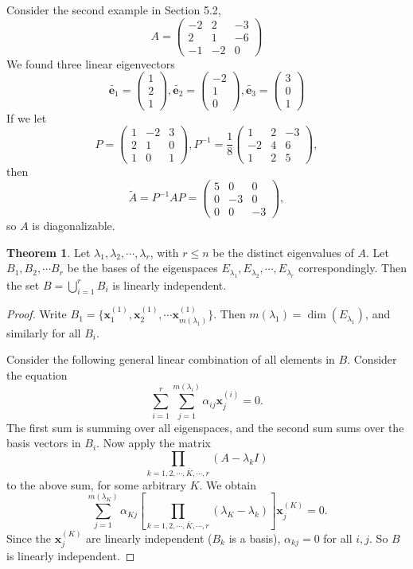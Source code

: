 \documentclass[a4paper]{article}
\theoremstyle{definition}
\newtheorem*{thm}{Theorem}
\newcommand{\mb}[1]{\mathbf{#1}}
\begin{document}
Consider the second example in Section 5.2,
\[
A = \begin{pmatrix}
  -2 & 2 & -3\\
  2 & 1 & -6\\
  -1 & -2 & 0
\end{pmatrix}
\]
We found three linear eigenvectors
\[
\tilde{\mb{e}_1} = 
\begin{pmatrix}
  1\\2\\1
\end{pmatrix}, \tilde{\mb{e}_2} = 
\begin{pmatrix}
  -2\\1\\0
\end{pmatrix}, \tilde{\mb{e}_3} = 
\begin{pmatrix}
  3\\0\\1
\end{pmatrix}
\]
If we let 
\[
P = 
\begin{pmatrix}
  1 & -2 & 3\\
  2 & 1 & 0\\
  1 & 0 & 1
\end{pmatrix}, P^{-1} = \frac{1}{8}
\begin{pmatrix}
  1 & 2 & -3\\
  -2 & 4 & 6\\
  1 & 2 & 5
\end{pmatrix},
\]
then 
\[
\tilde{A} = P^{-1}AP = 
\begin{pmatrix}
  5 & 0 & 0\\
  0 & -3 & 0\\
  0 & 0 & -3
\end{pmatrix},
\]
so $A$ is diagonalizable.

\begin{thm}
  Let $\lambda_1, \lambda_2, \cdots, \lambda_r$, with $r \leq n$ be the distinct eigenvalues of $A$. Let $B_1, B_2, \cdots B_r$ be the bases of the eigenspaces $E_{\lambda_1}, E_{\lambda_2}, \cdots, E_{\lambda_r}$ correspondingly. Then the set $\displaystyle B = \bigcup_{i= 1}^r B_i$ is linearly independent. 
\end{thm}

\begin{proof}
  Write $B_1 = \{\mb{x}_1^{(1)}, \mb{x}_2^{(1)}, \cdots \mb{x}_{m(\lambda_1)}^{(1)}\}$. Then $m(\lambda_1) = \dim (E_{\lambda_1})$, and similarly for all $B_i$.

Consider the following general linear combination of all elements in $B$. Consider the equation
\[
\sum_{i = 1}^r\sum_{j = 1}^{m(\lambda_i)} \alpha_{ij} \mb{x}_j^{(i)} = 0.
\]
The first sum is summing over all eigenspaces, and the second sum sums over the basis vectors in $B_i$. Now apply the matrix
\[
\prod_{k = 1, 2, \cdots, \bar{K}, \cdots, r} (A - \lambda_kI)
\]
to the above sum, for some arbitrary $K$. We obtain
\[
\sum_{j = 1}^{m(\lambda_K)}\alpha_{Kj}\left[\prod_{k = 1, 2, \cdots, \bar{K}, \cdots, r}(\lambda_K - \lambda_k)\right]\mb{x}_j^{(K)} = 0.
\]
Since the $\mb{x}^{(K)}_j$ are linearly independent ($B_k$ is a basis), $\alpha_{kj} = 0$ for all $i, j$. So $B$ is linearly independent.
\end{proof}
\end{document}
